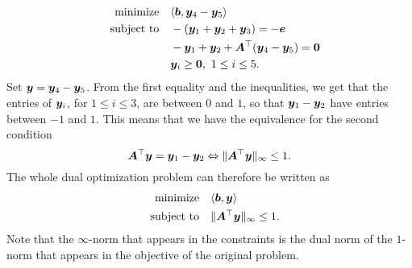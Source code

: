 \documentclass{article}
\begin{document}
\begin{align*}
 \text{minimize}\quad & \langle {\bm{b}}, {\bm{y}_4-\bm{y}_5} \rangle\\
 \quad\text{subject to}\quad & -(\bm{y}_1+\bm{y}_2+\bm{y}_3) = -\bm{e}\\
 & -\bm{y}_1+\bm{y}_2 +\bm{A}^{\top}(\bm{y}_4-\bm{y}_5) = \bm{0}\\
 & \bm{y}_i\geq \bm{0}, \ 1\leq i\leq 5.
\end{align*}
Set $\bm{y}=\bm{y}_4-\bm{y}_5$. From the first equality and the inequalities, we get that the entries of $\bm{y}_i$, for $1\leq i\leq 3$, are between $0$ and $1$, so that $\bm{y}_1-\bm{y}_2$ have entries between $-1$ and $1$. This means that we have the equivalence for the second condition
\begin{equation*}
 \bm{A}^{\top}\bm{y} = \bm{y}_1-\bm{y}_2 \Leftrightarrow \Vert {\bm{A}^{\top}\bm{y}}\Vert_\infty \leq 1. 
\end{equation*}
The whole dual optimization problem can therefore be written as
\begin{align*}
 \text{minimize}\quad & \langle {\bm{b}}, {\bm{y}} \rangle\\
 \quad\text{subject to}\quad & \Vert {\bm{A}^{\top}\bm{y}}\Vert_\infty\leq 1.
\end{align*}
Note that the $\infty$-norm that appears in the constraints is the dual norm of the $1$-norm that appears in the objective of the original problem.
\end{document}
